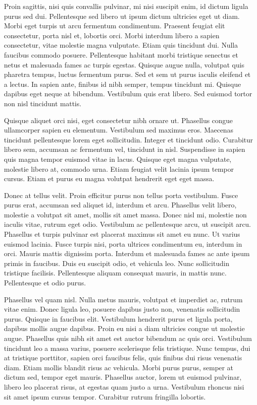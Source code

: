 \documentclass{amsbook}
\begin{document}
Proin sagittis, nisi quis convallis pulvinar, mi nisi suscipit enim, id dictum ligula purus sed dui. Pellentesque sed libero ut ipsum dictum ultricies eget ut diam. Morbi eget turpis ut arcu fermentum condimentum. Praesent feugiat elit consectetur, porta nisl et, lobortis orci. Morbi interdum libero a sapien consectetur, vitae molestie magna vulputate. Etiam quis tincidunt dui. Nulla faucibus commodo posuere. Pellentesque habitant morbi tristique senectus et netus et malesuada fames ac turpis egestas. Quisque augue nulla, volutpat quis pharetra tempus, luctus fermentum purus. Sed et sem ut purus iaculis eleifend et a lectus. In sapien ante, finibus id nibh semper, tempus tincidunt mi. Quisque dapibus eget neque at bibendum. Vestibulum quis erat libero. Sed euismod tortor non nisl tincidunt mattis.

Quisque aliquet orci nisi, eget consectetur nibh ornare ut. Phasellus congue ullamcorper sapien eu elementum. Vestibulum sed maximus eros. Maecenas tincidunt pellentesque lorem eget sollicitudin. Integer et tincidunt odio. Curabitur libero sem, accumsan ac fermentum vel, tincidunt in nisl. Suspendisse in sapien quis magna tempor euismod vitae in lacus. Quisque eget magna vulputate, molestie libero at, commodo urna. Etiam feugiat velit lacinia ipsum tempor cursus. Etiam et purus eu magna volutpat hendrerit eget eget massa.

Donec at tellus velit. Proin efficitur purus non tellus porta vestibulum. Fusce purus erat, accumsan sed aliquet id, interdum et arcu. Phasellus velit libero, molestie a volutpat sit amet, mollis sit amet massa. Donec nisl mi, molestie non iaculis vitae, rutrum eget odio. Vestibulum ac pellentesque arcu, ut suscipit arcu. Phasellus et turpis pulvinar est placerat maximus sit amet eu nunc. Ut varius euismod lacinia. Fusce turpis nisi, porta ultrices condimentum eu, interdum in orci. Mauris mattis dignissim porta. Interdum et malesuada fames ac ante ipsum primis in faucibus. Duis eu suscipit odio, et vehicula leo. Nunc sollicitudin tristique facilisis. Pellentesque aliquam consequat mauris, in mattis nunc. Pellentesque et odio purus.

Phasellus vel quam nisl. Nulla metus mauris, volutpat et imperdiet ac, rutrum vitae enim. Donec ligula leo, posuere dapibus justo non, venenatis sollicitudin purus. Quisque in faucibus elit. Vestibulum hendrerit purus et ligula porta, dapibus mollis augue dapibus. Proin eu nisi a diam ultricies congue ut molestie augue. Phasellus quis nibh sit amet est auctor bibendum ac quis orci. Vestibulum tincidunt leo a massa varius, posuere scelerisque felis tristique. Nunc tempus, dui at tristique porttitor, sapien orci faucibus felis, quis finibus dui risus venenatis diam. Etiam mollis blandit risus ac vehicula. Morbi purus purus, semper at dictum sed, tempor eget mauris. Phasellus auctor, lorem ut euismod pulvinar, libero leo placerat risus, at egestas quam justo a urna. Vestibulum rhoncus nisi sit amet ipsum cursus tempor. Curabitur rutrum fringilla lobortis.
\end{document}
